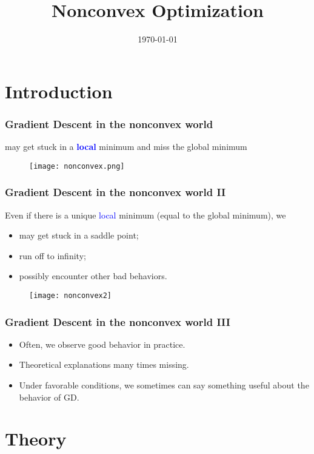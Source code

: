 \documentclass[aspectratio=149]{beamer}
\title{Nonconvex Optimization}
\date{\today}
\begin{document}
\maketitle
\frame{\tableofcontents}

\section{Introduction}

\begin{frame}
  \frametitle{Gradient Descent in the nonconvex world}

  may get stuck in a \textbf{\textcolor{blue}{local}} minimum and miss the global minimum

  \begin{figure}[ht]
    \centering
    \texttt{[image: nonconvex.png]}
  \end{figure}
\end{frame}


\begin{frame}
  \frametitle{Gradient Descent in the nonconvex world II}
  Even if there is a unique \textcolor{blue}{local} minimum (equal to the global minimum), we
  \begin{itemize}
    \item  may get stuck in a saddle point;
    \item run off to infinity;
    \item possibly encounter other bad behaviors.
  \end{itemize}
  \begin{figure}[ht]
    \centering
    \texttt{[image: nonconvex2]}
  \end{figure}
\end{frame}


\begin{frame}
  \frametitle{Gradient Descent in the nonconvex world III}
  \begin{itemize}
    \item Often, we observe good behavior in practice.
    \item Theoretical explanations many times missing.
    \item Under favorable conditions, we sometimes can say something useful about
  the behavior of GD.
  \end{itemize}
\end{frame}


\section{Theory}%
\label{sec:}
\end{document}
